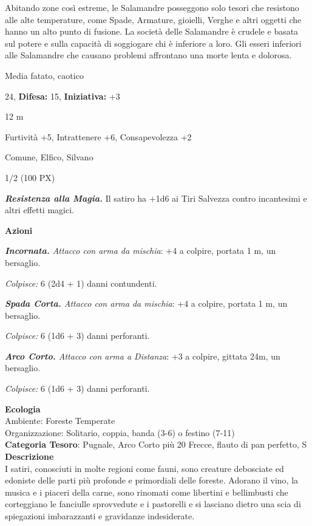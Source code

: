 \begin{multicols}{2}
{Abitando zone così estreme, le Salamandre posseggono solo tesori che resistono alle alte temperature, come Spade, Armature, gioielli, Verghe e altri oggetti che hanno un alto punto di fusione. La società delle Salamandre è crudele e basata sul potere e sulla capacità di soggiogare chi è inferiore a loro. Gli esseri inferiori alle Salamandre che causano problemi affrontano una morte lenta e dolorosa.

\noindent
\begin{description}[noitemsep, topsep=0pt, parsep=0pt, partopsep=0pt, leftmargin=0cm, labelwidth=2.2cm]
	\item[\textbf{Taglia/Tipo:}] Media fatato, caotico
	\item[\textbf{Caratt.:}] 
	\item[\textbf{Punti Ferita:}] 24,  \textbf{Difesa:} 15,  \textbf{Iniziativa:} +3
	\item[\textbf{Movimento:}] 12 m
	\item[\textbf{Tiri Salvez.:}] 
	\item[\textbf{Comp.:}] Furtività +5, Intrattenere +6, Consapevolezza +2
	\item[\textbf{Linguaggi:}] Comune, Elfico, Silvano
	\item[\textbf{Sfida:}] 1/2 (100 PX)\smallskip
\end{description}

\emph{\textbf{Resistenza alla Magia.}} Il satiro ha +1d6 ai Tiri Salvezza contro incantesimi e altri effetti magici.

\textbf{Azioni}

\emph{\textbf{Incornata.} Attacco con arma da mischia}: +4 a colpire, portata 1 m, un bersaglio.

\emph{Colpisce:} 6 (2d4 + 1) danni contundenti.

\emph{\textbf{Spada Corta.} Attacco con arma da mischia}: +4 a colpire, portata 1 m, un bersaglio.

\emph{Colpisce:} 6 (1d6 + 3) danni perforanti.

\emph{\textbf{Arco Corto.} Attacco con arma a Distanza}: +3 a colpire, gittata 24m, un bersaglio.

\emph{Colpisce:} 6 (1d6 + 3) danni perforanti.

\textbf{Ecologia}\\
Ambiente: Foreste Temperate\\
Organizzazione: Solitario, coppia, banda (3-6) o festino (7-11)\\
\textbf{Categoria Tesoro}: Pugnale, Arco Corto più 20 Frecce, flauto di pan perfetto, S\\
\textbf{Descrizione}\\
I satiri, conosciuti in molte regioni come fauni, sono creature debosciate ed edoniste delle parti più profonde e primordiali delle foreste. Adorano il vino, la musica e i piaceri della carne, sono rinomati come libertini e bellimbusti che corteggiano le fanciulle sprovvedute e i pastorelli e si lasciano dietro una scia di spiegazioni imbarazzanti e gravidanze indesiderate.

}
\end{multicols}
